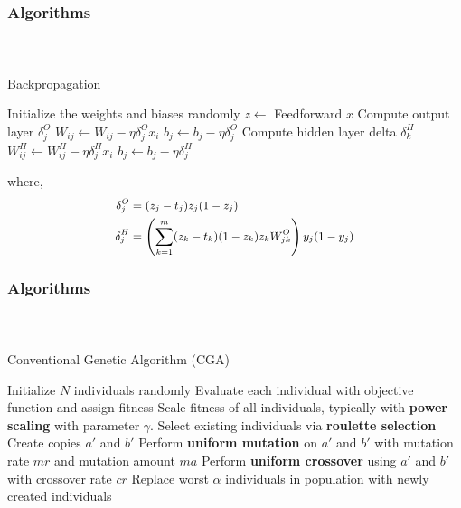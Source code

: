 
\begin{frame}[t]
	\frametitle{Algorithms}
	\framesubtitle{~~}  %

\begin{minipage}[c]{0.45\linewidth}
\begin{algorithm}[H]
	\small
\caption{Backpropagation}
\label{alg:backprop}
\begin{algorithmic}
\STATE Initialize the weights and biases randomly
    \STATE $z\gets$ Feedforward $x$
    \STATE Compute output layer $\delta_j^O$
    \STATE ${W_{ij} \leftarrow W_{ij} - \eta \delta^O_j x_i}$
    \STATE $b_j \leftarrow b_j - \eta\delta^O_j$
      \STATE Compute hidden layer delta $\delta_k^H$
      \STATE ${W^H_{ij} \leftarrow W^H_{ij} - \eta\delta^H_jx_i}$
      \STATE $b_j \leftarrow b_j - \eta\delta^H_j$
    \ENDFOR
  \ENDFOR
\ENDFOR
\end{algorithmic}
\end{algorithm}
\end{minipage}\qquad
\begin{minipage}[c]{0.45\linewidth}
where,
\begin{equation*}
	\small
	\begin{split}
\delta^O_j &= (z_j-t_j)z_j(1-z_j) \\
\delta^H_j &= \left(\sum_{k=1}^m (z_k - t_k)(1-z_k)z_kW_{jk}^O \right)y_j(1-y_j)
\end{split}
\end{equation*}
\end{minipage}

\end{frame}
\begin{frame}[t]
	\frametitle{Algorithms}
	\framesubtitle{~~}  %

\begin{algorithm}[H]
\small
\caption{Conventional Genetic Algorithm (CGA)}
\label{alg:genetic}
\begin{algorithmic}
\STATE Initialize $N$ individuals randomly
  \STATE Evaluate each individual with objective function and assign fitness
  \STATE Scale fitness of all individuals, typically with \textbf{power scaling} with parameter $\gamma$.
  \STATE Select existing individuals via \textbf{roulette selection}
    \STATE Create copies $a'$ and $b'$
    \STATE Perform \textbf{uniform mutation} on $a'$ and $b'$ with mutation rate $mr$ and mutation amount $ma$
    \STATE Perform \textbf{uniform crossover} using $a'$ and $b'$ with crossover rate $cr$
  \ENDFOR
  \STATE Replace worst $\alpha$ individuals in population with newly created individuals
\ENDFOR
\end{algorithmic}
\end{algorithm}

\end{frame}
